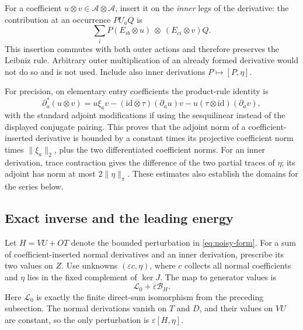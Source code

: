 \documentclass[11pt]{article}
\theoremstyle{definition}\newtheorem{definition}[theorem]{Definition}
\theoremstyle{remark}\newtheorem{remark}[theorem]{Remark}
\newcommand{\eps}{\varepsilon}\newcommand{\id}{\mathrm{id}}
\begin{document}
For a coefficient $u\otimes v\in\mathcal A\otimes\mathcal A$,
insert it on the \emph{inner} legs of the derivative: the contribution
at an occurrence $P U_a Q$ is
\begin{equation}\label{eq:insertion}
 \sum_i P(E_{ib}\otimes u)\ \otimes\ (E_{ci}\otimes v)Q.
\end{equation}
This insertion commutes with both outer actions and therefore preserves
the Leibniz rule. Arbitrary outer multiplication of an already formed
derivative would not do so and is not used. Include also inner
derivations $P\mapsto[P,\eta]$.

For precision, on elementary entry coefficients the product-rule
identity is
\begin{equation}\label{eq:adjoint-product}
 \partial_a^*(u\otimes v)
 =u\xi_av-(\id\otimes\tau)(\partial_a u)v
              -u(\tau\otimes\id)(\partial_a v),
\end{equation}
with the standard adjoint modifications if using the sesquilinear
instead of the displayed conjugate pairing. This proves that the
adjoint norm of a coefficient-inserted derivative is bounded by a
constant times its projective coefficient norm times $\|\xi_a\|_2$,
plus the two differentiated coefficient norms. For an inner derivation,
trace contraction gives the difference of the two partial traces of
$\eta$; its adjoint has norm at most $2\|\eta\|_\pi$.
These estimates also establish the domains for the series below.

\subsection{Exact inverse and the leading energy}
Let $H=VU+OT$ denote the bounded perturbation in \eqref{eq:noisy-form}.
For a sum of coefficient-inserted normal derivatives and an inner
derivation, prescribe its two values on $Z$. Use unknowns
$(\eps c,\eta)$, where $c$ collects all normal coefficients and
$\eta$ lies in the fixed complement of $\ker J$. The map to generator
values is
\begin{equation}\label{eq:score-inverse}
 \mathcal L_0+\eps\mathcal B_H.
\end{equation}
Here $\mathcal L_0$ is exactly the finite direct-sum isomorphism from
the preceding subsection. The normal derivations vanish on $T$ and
$D$, and their values on $VU$ are constant, so the only perturbation is
$\eps[H,\eta]$.
\end{document}
